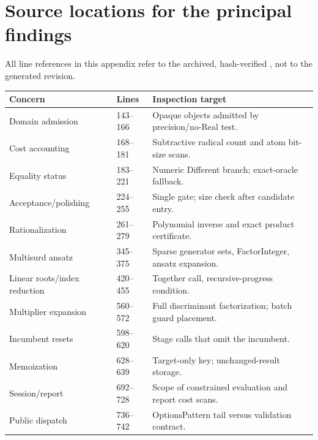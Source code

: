 \documentclass[11pt,a4paper]{article}
\newcommand{\code}[1]{\texttt{\detokenize{#1}}}
\theoremstyle{definition}\newtheorem{definition}[proposition]{Definition}
\theoremstyle{remark}\newtheorem{remark}[proposition]{Remark}
\begin{document}
\section{Source locations for the principal findings}
All line references in this appendix refer to the archived, hash-verified
\code{StradFixed2.original.wl}, not to the generated revision.
\begin{longtable}{@{}P{.28\textwidth}P{.20\textwidth}P{.45\textwidth}@{}}
\toprule
Concern & Lines & Inspection target\\\midrule\endhead
Domain admission & 143--166 & Opaque objects admitted by precision/no-Real test.\\
Cost accounting & 168--181 & Subtractive radical count and atom bit-size scans.\\
Equality status & 183--221 & Numeric Different branch; exact-oracle fallback.\\
Acceptance/polishing & 224--255 & Single gate; size check after candidate entry.\\
Rationalization & 261--279 & Polynomial inverse and exact product certificate.\\
Multisurd ansatz & 345--375 & Sparse generator sets, FactorInteger, ansatz expansion.\\
Linear roots/index reduction & 420--455 & Together call, recursive-progress condition.\\
Multiplier expansion & 560--572 & Full discriminant factorization; batch guard placement.\\
Incumbent resets & 598--620 & Stage calls that omit the incumbent.\\
Memoization & 628--639 & Target-only key; unchanged-result storage.\\
Session/report & 692--728 & Scope of constrained evaluation and report cost scans.\\
Public dispatch & 736--742 & OptionsPattern tail versus validation contract.\\\bottomrule
\end{longtable}
\end{document}
